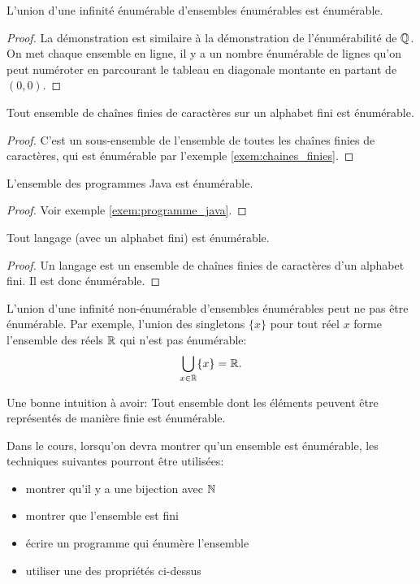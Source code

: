 \begin{myprop}
	L'union d'une infinité énumérable d'ensembles énumérables est énumérable.
    \begin{proof}
      La démonstration est similaire à la démonstration de l'énumérabilité de $\mathbb{Q}$.
      On met chaque ensemble en ligne, il y a un nombre énumérable de lignes qu'on peut numéroter en parcourant le tableau en diagonale montante en partant de $(0,0)$.
    \end{proof}
\end{myprop}

\begin{myprop}
 Tout ensemble de chaînes finies de caractères sur un alphabet fini est énumérable.
 \begin{proof}
C'est un sous-ensemble de l'ensemble de toutes les chaînes finies de caractères, qui est énumérable par l'exemple \ref{exem:chaines_finies}.
 \end{proof}
\end{myprop}

\begin{myprop} \label{prop:programme_enumerable}
 L'ensemble des programmes Java est énumérable.
 \begin{proof}
  Voir exemple \ref{exem:programme_java}.
 \end{proof}
\end{myprop}


\begin{myprop}
 Tout langage (avec un alphabet fini) est énumérable.
 \begin{proof}
 Un langage est un ensemble de chaînes finies de caractères d'un alphabet fini.  Il est donc  énumérable.
 \end{proof}
\end{myprop}

L'union d'une infinité non-énumérable d'ensembles énumérables peut ne pas être énumérable.
Par exemple, l'union des singletons $\{x\}$ pour tout réel $x$ forme l'ensemble des réels $\mathbb{R}$ qui n'est pas énumérable:
\[ \bigcup_{x \in \mathbb{R}} \{x\} = \mathbb{R}. \]

\begin{myrem}
  Une bonne intuition à avoir:
  Tout ensemble dont les éléments peuvent être représentés de manière finie est énumérable.
\end{myrem}

Dans le cours, lorsqu'on devra montrer qu'un ensemble est énumérable,
les techniques suivantes pourront être utilisées:
\begin{itemize}
	\item montrer qu'il y a une bijection avec $\mathbb{N}$
	\item montrer que l'ensemble est fini
	\item écrire un programme qui énumère l'ensemble
	\item utiliser une des propriétés ci-dessus
\end{itemize}


